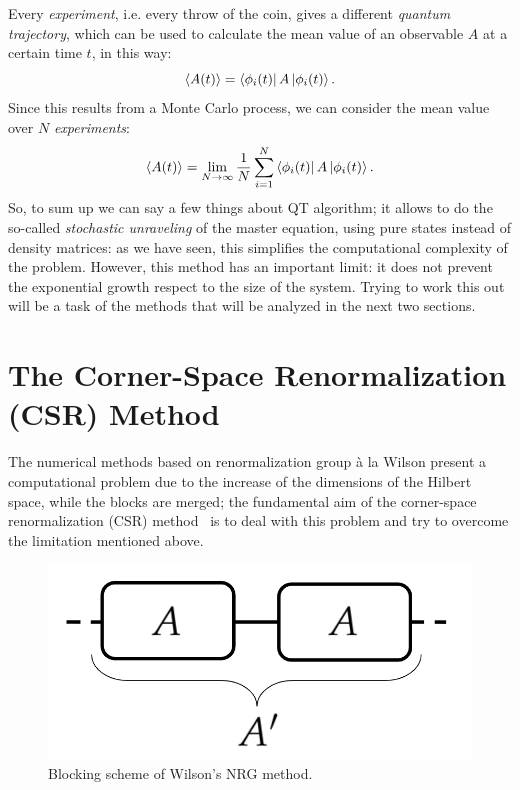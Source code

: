 Every \emph{experiment}, i.e. every throw of the coin, gives a different \emph{quantum trajectory}, which can be used to calculate the mean value of an observable $A$ at a certain time $t$, in this way:
\begin{equation}
    \langle A(t)\rangle = \bra{\phi_i(t)}A\ket{\phi_i(t)}.
\end{equation}
Since this results from a Monte Carlo process, we can consider the mean value over $N$ \emph{experiments}:
\begin{equation}
    \langle A(t)\rangle = \lim_{N\to\infty} \frac{1}{N}\sum_{i=1}^{N}\bra{\phi_i(t)}A\ket{\phi_i(t)}.
\end{equation}
So, to sum up we can say a few things about QT algorithm; it allows to do the so-called \emph{stochastic unraveling} of the master equation, using pure states instead of density matrices: as we have seen, this simplifies the computational complexity of the problem. However, this method has an important limit: it does not prevent the exponential growth respect to the size of the system. Trying to work this out will be a task of the methods that will be analyzed in the next two sections.

\section{The Corner-Space Renormalization (CSR) Method}
\label{chapter3_csr}
The numerical methods based on renormalization group à la Wilson present a computational problem due to the increase of the dimensions of the Hilbert space, while the blocks are merged; the fundamental aim of the corner-space renormalization (CSR) method~\cite{PhysRevLett.115.080604} is to deal with this problem and try to overcome the limitation mentioned above. 


\begin{figure}[H]
    \centering
    \includegraphics[scale=0.3]{Figures/wilson.png}
    \captionsetup{width=1.\linewidth}
    \caption{Blocking scheme of Wilson's NRG method.}
    \label{fig:wilson}
\end{figure}

